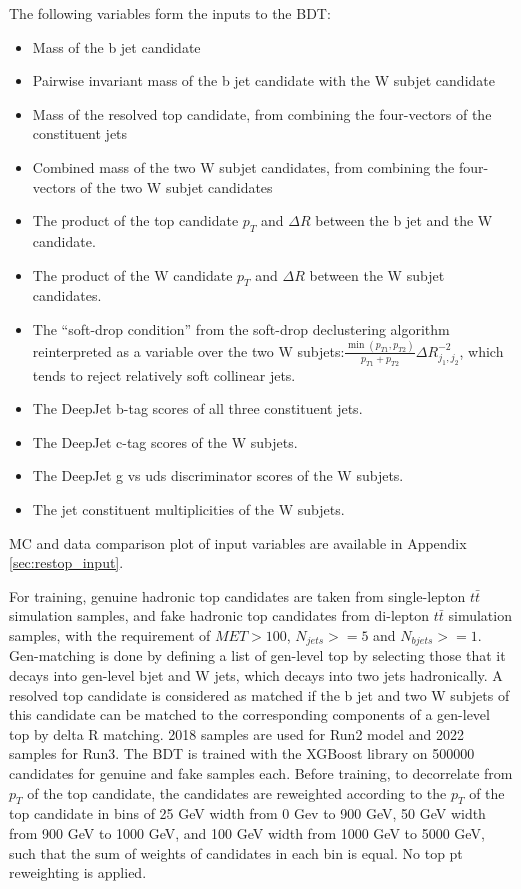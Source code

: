 \documentclass[twoside]{article}
\begin{document}
The following variables form the inputs to the BDT:

\begin{itemize}
  \item Mass of the b jet candidate
  \item Pairwise invariant mass of the b jet candidate with the W subjet candidate
  \item Mass of the resolved top candidate, from combining the four-vectors of the constituent jets
  \item Combined mass of the two W subjet candidates, from combining the four-vectors of the two W subjet candidates
  \item The product of the top candidate $p_{T}$ and $\Delta R$ between the b jet and the W candidate.
  \item The product of the W candidate $p_{T}$ and $\Delta R$ between the W subjet candidates.
  \item The ``soft-drop condition'' from the soft-drop declustering algorithm reinterpreted as a variable over the two W subjets:$\frac{\min(p_{T1}, p_{T2})}{p_{T1} + p_{T2}} \Delta R_{j_1, j_2}^{-2}$, which tends to reject relatively soft collinear jets.
  \item The DeepJet b-tag scores of all three constituent jets.
  \item The DeepJet c-tag scores of the W subjets. %
  \item The DeepJet g vs uds discriminator scores of the W subjets.
  \item The jet constituent multiplicities of the W subjets.
\end{itemize}

MC and data comparison plot of input variables are available in Appendix \ref{sec:restop_input}.

For training, genuine hadronic top candidates are taken from single-lepton $t\bar{t}$ simulation samples, and fake hadronic top candidates from di-lepton $t\bar{t}$ simulation samples, with the requirement of $MET>100$,  $N_{jets}>=5$ and $N_{bjets}>=1$. Gen-matching is done by defining a list of gen-level top by selecting those that it decays into gen-level bjet and W jets, which decays into two jets hadronically. A resolved top candidate is considered as matched if the b jet and two W subjets of this candidate can be matched to the corresponding components of a gen-level top by delta R matching. 2018 samples are used for Run2 model and 2022 samples for Run3. The BDT is trained with the XGBoost library on 500000 candidates for genuine and fake samples each. Before training, to decorrelate from $p_{T}$ of the top candidate, the candidates are reweighted according to the $p_{T}$ of the top candidate in bins of 25 GeV width from 0 Gev to 900 GeV, 50 GeV width from 900 GeV to 1000 GeV, and 100 GeV width from 1000 GeV to 5000 GeV, such that the sum of weights of candidates in each bin is equal. No top pt reweighting is applied. \\
\end{document}
